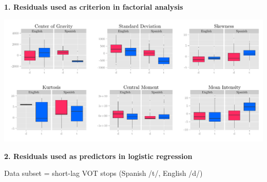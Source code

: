 \documentclass[a0paper,portrait,columns=2]{baposter}
\begin{document}
\begin{poster}
{\vspace{.2in}

\hspace{.2in}\textbf{\textcolor{uared}{1. Residuals used as criterion in factorial analysis}}
\vspace{-.1in}
\begin{center}
	\includegraphics[width=\linewidth]{figures/residuals.pdf}
	\vspace{-.3in}
	
\end{center}

\vspace{.2in}

\hspace{.2in}\textbf{\textcolor{uared}{2. Residuals used as predictors in logistic regression}}\\

\vspace{-.1in}

\hspace{.35in} \scriptsize{Data subset = short-lag VOT stops (Spanish /t/, English /d/)} \\

\begin{center}
	\vspace{-.3in}
	
\end{center}


\vspace{-.25pt}



}


\end{poster}
\end{document}
